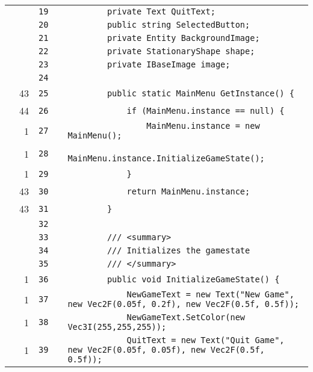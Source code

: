 \documentclass[a4paper,landscape,10pt]{article}
\begin{document}
\begin{longtable}[l]{lrrll}
\cellcolor{gray} &  & \verb~19~ & & \verb~        private Text QuitText;~\\
\cellcolor{gray} &  & \verb~20~ & & \verb~        public string SelectedButton;~\\
\cellcolor{gray} &  & \verb~21~ & & \verb~        private Entity BackgroundImage;~\\
\cellcolor{gray} &  & \verb~22~ & & \verb~        private StationaryShape shape;~\\
\cellcolor{gray} &  & \verb~23~ & & \verb~        private IBaseImage image;~\\
\cellcolor{gray} &  & \verb~24~ & & \verb~~\\
\cellcolor{green} & 43 & \verb~25~ & & \verb~        public static MainMenu GetInstance() {~\\
\cellcolor{green} & 44 & \verb~26~ & & \verb~            if (MainMenu.instance == null) {~\\
\cellcolor{green} & 1 & \verb~27~ & & \verb~                MainMenu.instance = new MainMenu();~\\
\cellcolor{green} & 1 & \verb~28~ & & \verb~                MainMenu.instance.InitializeGameState();~\\
\cellcolor{green} & 1 & \verb~29~ & & \verb~            }~\\
\cellcolor{green} & 43 & \verb~30~ & & \verb~            return MainMenu.instance;~\\
\cellcolor{green} & 43 & \verb~31~ & & \verb~        }~\\
\cellcolor{gray} &  & \verb~32~ & & \verb~~\\
\cellcolor{gray} &  & \verb~33~ & & \verb~        /// <summary>~\\
\cellcolor{gray} &  & \verb~34~ & & \verb~        /// Initializes the gamestate~\\
\cellcolor{gray} &  & \verb~35~ & & \verb~        /// </summary>~\\
\cellcolor{green} & 1 & \verb~36~ & & \verb~        public void InitializeGameState() {~\\
\cellcolor{green} & 1 & \verb~37~ & & \verb~            NewGameText = new Text("New Game", new Vec2F(0.05f, 0.2f), new Vec2F(0.5f, 0.5f));~\\
\cellcolor{green} & 1 & \verb~38~ & & \verb~            NewGameText.SetColor(new Vec3I(255,255,255));~\\
\cellcolor{green} & 1 & \verb~39~ & & \verb~            QuitText = new Text("Quit Game", new Vec2F(0.05f, 0.05f), new Vec2F(0.5f,  0.5f));~\\

\end{longtable}
\end{document}
